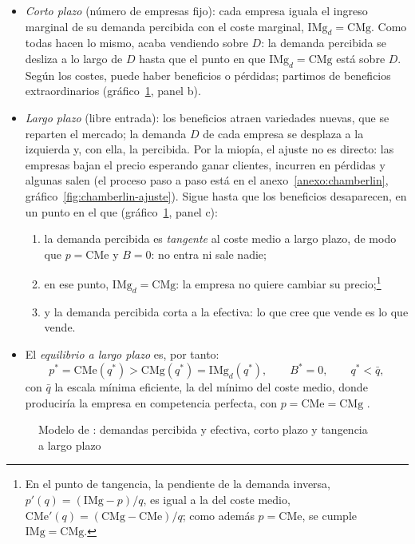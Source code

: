 \documentclass[11pt]{article}
\begin{document}
\begin{itemize}
\item \emph{Corto plazo} (número de empresas fijo): cada empresa iguala el ingreso marginal de su demanda percibida con el coste marginal, $\mathrm{IMg}_d=\mathrm{CMg}$. Como todas hacen lo mismo, acaba vendiendo sobre $D$: la demanda percibida se desliza a lo largo de $D$ hasta que el punto en que $\mathrm{IMg}_d=\mathrm{CMg}$ está sobre $D$. Según los costes, puede haber beneficios o pérdidas; partimos de beneficios extraordinarios (gráfico~\ref{fig:chamberlin}, panel b).
\item \emph{Largo plazo} (libre entrada): los beneficios atraen variedades nuevas, que se reparten el mercado; la demanda $D$ de cada empresa se desplaza a la izquierda y, con ella, la percibida. Por la miopía, el ajuste no es directo: las empresas bajan el precio esperando ganar clientes, incurren en pérdidas y algunas salen (el proceso paso a paso está en el anexo~\ref{anexo:chamberlin}, gráfico~\ref{fig:chamberlin-ajuste}). Sigue hasta que los beneficios desaparecen, en un punto en el que (gráfico~\ref{fig:chamberlin}, panel c):
  \begin{enumerate}
  \item la demanda percibida es \emph{tangente} al coste medio a largo plazo, de modo que $p=\mathrm{CMe}$ y $B=0$: no entra ni sale nadie;
  \item en ese punto, $\mathrm{IMg}_d=\mathrm{CMg}$: la empresa no quiere cambiar su precio;\footnote{En el punto de tangencia, la pendiente de la demanda inversa, $p'(q)=(\mathrm{IMg}-p)/q$, es igual a la del coste medio, $\mathrm{CMe}'(q)=(\mathrm{CMg}-\mathrm{CMe})/q$; como además $p=\mathrm{CMe}$, se cumple $\mathrm{IMg}=\mathrm{CMg}$.}
  \item y la demanda percibida corta a la efectiva: lo que cree que vende es lo que vende.
  \end{enumerate}
\item El \emph{equilibrio a largo plazo} es, por tanto:
  \begin{equation}\label{eq:chamberlin}
  p^*=\mathrm{CMe}(q^*)>\mathrm{CMg}(q^*)=\mathrm{IMg}_d(q^*),\qquad B^*=0,\qquad q^*<\bar{q},
  \end{equation}
  con $\bar{q}$ la escala mínima eficiente, la del mínimo del coste medio, donde produciría la empresa en competencia perfecta, con $p=\mathrm{CMe}=\mathrm{CMg}$ .
\end{itemize}

\begin{figure}[H]
\centering
\caption{Modelo de : demandas percibida y efectiva, corto plazo y tangencia a largo plazo}\label{fig:chamberlin}
\end{figure}
\end{document}
